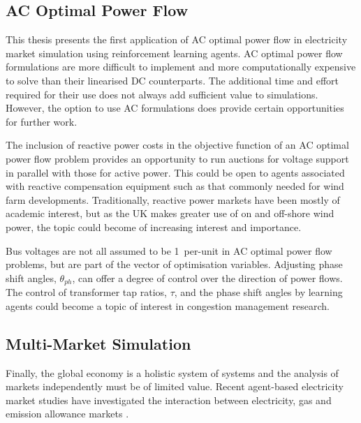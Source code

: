 
\subsection{AC Optimal Power Flow}
This thesis presents the first application of AC optimal power flow in
electricity market simulation using reinforcement learning agents.  AC optimal
power flow formulations are more difficult to implement and more computationally
expensive to solve than their linearised DC counterparts.  The
additional time and effort required for their use does not always add sufficient
value to simulations.  However, the option to use AC formulations does
provide certain opportunities for further work.

The inclusion of reactive power costs in the objective function of an AC optimal
power flow problem provides an opportunity to run auctions for voltage support
in parallel with those for active power.  This could be open to agents
associated with reactive compensation equipment such as that commonly needed for
wind farm developments.  Traditionally, reactive power markets have been mostly
of academic interest, but as the UK makes greater use of on and off-shore wind
power, the topic could become of increasing interest and importance.

Bus voltages are not all assumed to be 1~per-unit in AC optimal power flow
problems, but are part of the vector of optimisation variables.  Adjusting
phase shift angles, $\theta_{ph}$, can offer a degree of control over
the direction of power flows.  The control of transformer tap ratios, $\tau$,
and the phase shift angles by learning agents could become a topic of interest
in congestion management research.

\subsection{Multi-Market Simulation}
Finally, the global economy is a holistic system of
systems and the analysis of markets independently must be of limited value.
Recent agent-based electricity market studies have investigated the
interaction between electricity, gas and emission allowance markets
\cite{krause:gas,wang:09}.

